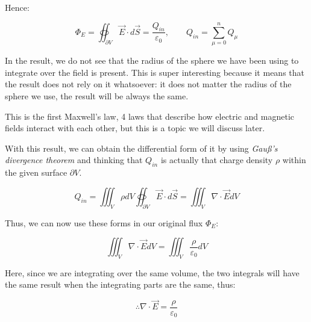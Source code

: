 \documentclass[12pt]{article}
\begin{document}
	Hence:
	
	\[
		\Phi_E
		= \oiint_{\partial V} \vec{E} \cdot d\vec{S}
		= \frac{Q_{in}}{\varepsilon_0},
		\hspace{2em}
		Q_{in} = \sum_{\mu = 0}^n Q_\mu
	\]
	
	In the result, we do not see that the radius of the sphere we have been using to integrate over the field is present. This is super interesting because it means that the result does not rely on it whatsoever: it does not matter the radius of the sphere we use, the result will be always the same.
	
	This is the first Maxwell's law, 4 laws that describe how electric and magnetic fields interact with each other, but this is a topic we will discuss later.
	
	With this result, we can obtain the differential form of it by using \emph{Gauß's divergence theorem} and thinking that $Q_{in}$ is actually that charge density $\rho$ within the given surface $\partial V$.
	
	\[
		Q_{in} = \iiint_{V} \rho dV
		\oiint_{\partial V} \vec{E} \cdot d\vec{S}
		= \iiint_V \nabla \cdot \vec{E} dV
	\]
	
	Thus, we can now use these forms in our original flux $\Phi_E$:
	
	\[
		\iiint_V \nabla \cdot \vec{E} dV
		= \iiint_V \frac{\rho}{\varepsilon_0} dV
	\]
	
	Here, since we are integrating over the same volume, the two integrals will have the same result when the integrating parts are the same, thus:
	
	\[
		\therefore \nabla \cdot \vec{E} = \frac{\rho}{\varepsilon_0}
	\]
	
\end{document}
